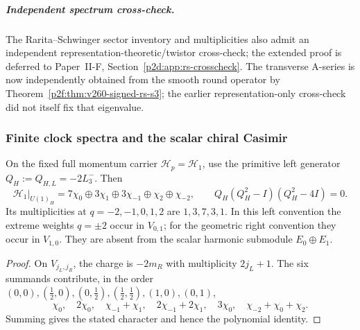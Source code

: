 \documentclass[12pt,a4paper]{article}
\begin{document}
\subparagraph{Independent spectrum cross-check.}
The Rarita--Schwinger sector inventory and multiplicities also admit an
independent representation-theoretic/twistor cross-check; the extended proof
is deferred to Paper~II-F, Section~\ref{p2d:app:rs-crosscheck}.  The transverse A-series is now independently obtained from the smooth
round operator by Theorem~\ref{p2f:thm:v260-signed-rs-s3};
the earlier representation-only cross-check did not itself fix that eigenvalue.


\subsubsection{Finite clock spectra and the scalar chiral Casimir}
\label{p2d:sec:v180-clock-kinematics}

\begin{proposition}
\label{p2d:prop:level-one-hopf-weight-multiplicities}
On the fixed full momentum carrier \(\mathcal H_p=\mathcal H_1\),
use the primitive left generator \(Q_H:=Q_{H,L}=-2L_3^-\).
Then
\[
 \mathcal H_1|_{U(1)_H}
 =7\chi_0\oplus3\chi_1\oplus3\chi_{-1}\oplus\chi_2\oplus\chi_{-2},
 \qquad Q_H(Q_H^2-I)(Q_H^2-4I)=0.
\]
Its multiplicities at \(q=-2,-1,0,1,2\) are \(1,3,7,3,1\).
In this left convention the extreme weights \(q=\pm2\) occur in
\(V_{0,1}\); for the geometric right convention they occur in \(V_{1,0}\).
They are absent from the scalar harmonic submodule \(E_0\oplus E_1\).
\end{proposition}

\begin{proof}
On \(V_{j_L,j_R}\), the charge is \(-2m_R\) with multiplicity \(2j_L+1\).
The six summands contribute, in the order
\((0,0),(\tfrac12,0),(0,\tfrac12),
(\tfrac12,\tfrac12),(1,0),(0,1)\),
\[
 \chi_0,\quad 2\chi_0,\quad
 \chi_{-1}+\chi_1,\quad 2\chi_{-1}+2\chi_1,\quad
 3\chi_0,\quad \chi_{-2}+\chi_0+\chi_2.
\]
Summing gives the stated character and hence the polynomial identity.
\end{proof}
\end{document}
